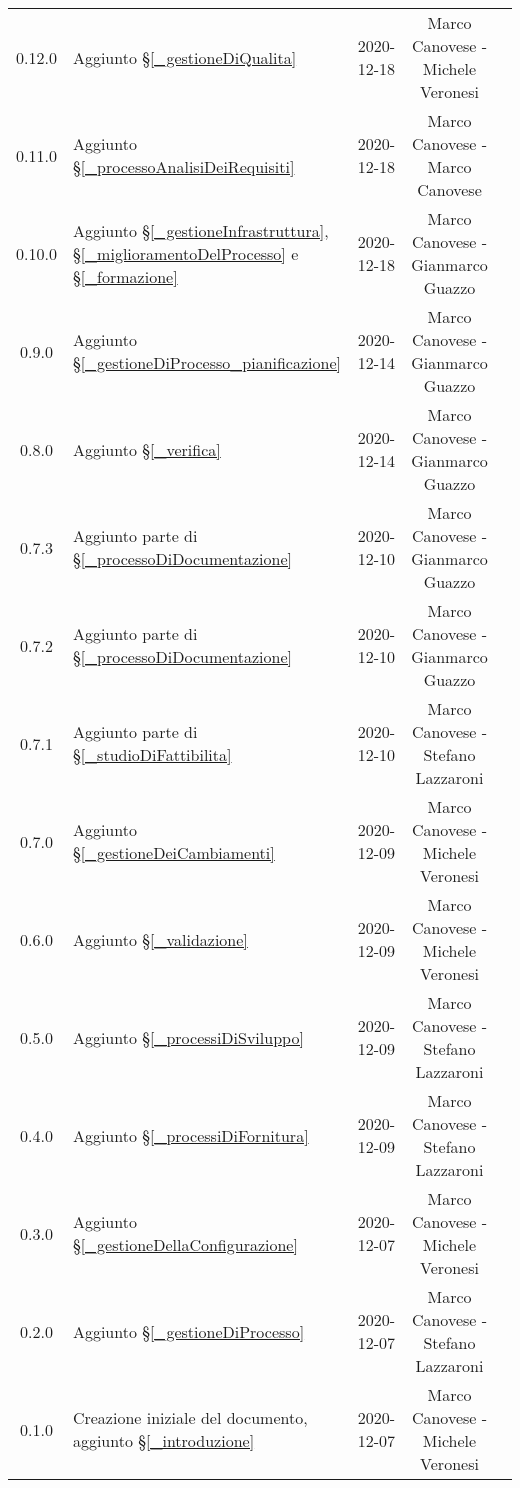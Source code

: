 \begin{center}
\begin{longtable}{|c|p{5cm}|c|c|c|}
		0.12.0 & Aggiunto \S\ref{_gestioneDiQualita} & 2020-12-18 & Marco Canovese - Michele Veronesi \\
		0.11.0 & Aggiunto \S\ref{_processoAnalisiDeiRequisiti} & 2020-12-18 & Marco Canovese - Marco Canovese  \\
		0.10.0 & Aggiunto \S\ref{_gestioneInfrastruttura}, \S\ref{_miglioramentoDelProcesso} e \S\ref{_formazione} & 2020-12-18 & Marco Canovese - Gianmarco Guazzo  \\
		0.9.0 & Aggiunto \S\ref{_gestioneDiProcesso_pianificazione} & 2020-12-14 & Marco Canovese - Gianmarco Guazzo \\
		0.8.0 & Aggiunto \S\ref{_verifica} & 2020-12-14& Marco Canovese - Gianmarco Guazzo \\
		0.7.3 & Aggiunto parte di \S\ref{_processoDiDocumentazione} & 2020-12-10 & Marco Canovese - Gianmarco Guazzo \\
		0.7.2 & Aggiunto parte di \S\ref{_processoDiDocumentazione} & 2020-12-10 & Marco Canovese - Gianmarco Guazzo \\
		0.7.1 & Aggiunto parte di \S\ref{_studioDiFattibilita} & 2020-12-10 & Marco Canovese - Stefano Lazzaroni  \\
		0.7.0 & Aggiunto \S\ref{_gestioneDeiCambiamenti} & 2020-12-09 & Marco Canovese - Michele Veronesi \\
		0.6.0 & Aggiunto \S\ref{_validazione} & 2020-12-09 & Marco Canovese - Michele Veronesi  \\
		0.5.0 & Aggiunto \S\ref{_processiDiSviluppo} & 2020-12-09 & Marco Canovese - Stefano Lazzaroni  \\
		0.4.0 & Aggiunto \S\ref{_processiDiFornitura} & 2020-12-09 & Marco Canovese - Stefano Lazzaroni \\
		0.3.0 & Aggiunto \S\ref{_gestioneDellaConfigurazione} & 2020-12-07 & Marco Canovese - Michele Veronesi  \\
		0.2.0 & Aggiunto \S\ref{_gestioneDiProcesso} & 2020-12-07 & Marco Canovese - Stefano Lazzaroni \\
		0.1.0 & Creazione iniziale del documento, aggiunto \S\ref{_introduzione} & 2020-12-07 & Marco Canovese - Michele Veronesi \\
		
		\hline
	\end{longtable}
\end{center}